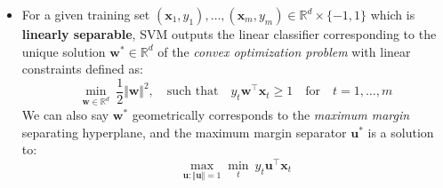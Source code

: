 \begin{itemize}
    \item For a given training set $(\boldsymbol{x}_1, y_1), \dots, (\boldsymbol{x}_m, y_m) \in \mathbb{R}^d \times \{-1, 1\}$ which is \textbf{linearly separable}, SVM outputs the linear classifier corresponding to the unique solution $\boldsymbol{w}^* \in \mathbb{R}^d$ of the \textit{convex optimization problem} with linear constraints defined as:
    \begin{equation}
        \underset{\boldsymbol{w} \in \mathbb{R}^d}{\min}\ \frac{1}{2} \Vert \boldsymbol{w} \Vert^2, \quad \text{such that} \quad y_t \boldsymbol{w}^\top \boldsymbol{x}_t \geq 1 \quad \text{for} \quad t = 1, \dots, m
    \end{equation}
    We can also say $\boldsymbol{w}^{*}$ geometrically corresponds to the \textit{maximum margin} separating hyperplane, and the maximum margin separator $\boldsymbol{u}^{*}$ is a solution to:
    \begin{equation}
        \underset{\boldsymbol{u} : \Vert \boldsymbol{u} \Vert = 1}{\max} \underset{t}{\min} \ y_t \boldsymbol{u}^\top \boldsymbol{x}_t
    \end{equation}


\end{itemize}
